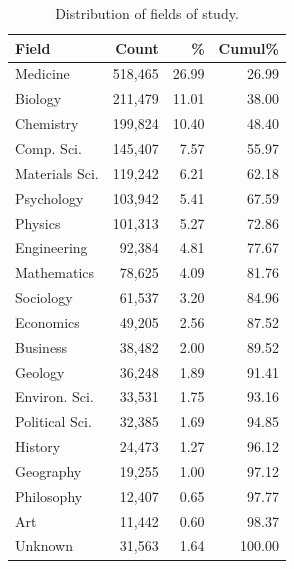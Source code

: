 \documentclass[11pt]{article}
\begin{document}
\begin{table}[htbp]
    \centering
    \normalsize

    \begin{tabular}{@{}lrrr@{}}
    \toprule
    \textbf{Field} & \textbf{Count} & \% & \textbf{Cumul}\% \\
    \midrule
        Medicine & 518,465 & 26.99 & 26.99 \\
        Biology & 211,479 & 11.01 & 38.00 \\
        Chemistry & 199,824 & 10.40 & 48.40 \\
        Comp. Sci. & 145,407 & 7.57 & 55.97 \\
        Materials Sci. & 119,242 & 6.21 & 62.18 \\
        Psychology & 103,942 & 5.41 & 67.59 \\
        Physics & 101,313 & 5.27 & 72.86 \\
        Engineering & 92,384 & 4.81 & 77.67 \\
        Mathematics & 78,625 & 4.09 & 81.76 \\
        Sociology & 61,537 & 3.20 & 84.96 \\
        Economics & 49,205 & 2.56 & 87.52 \\
        Business & 38,482 & 2.00 & 89.52 \\
        Geology & 36,248 & 1.89 & 91.41 \\
        Environ. Sci. & 33,531 & 1.75 & 93.16 \\
        Political Sci. & 32,385 & 1.69 & 94.85 \\
        History & 24,473 & 1.27 & 96.12 \\
        Geography & 19,255 & 1.00 & 97.12 \\
        Philosophy & 12,407 & 0.65 & 97.77 \\
        Art & 11,442 & 0.60 & 98.37 \\
        Unknown & 31,563 & 1.64 & 100.00 \\
    \bottomrule
    \end{tabular}
    \caption{Distribution of fields of study.}
    \label{tab:fos-dist}
\end{table}
\end{document}
